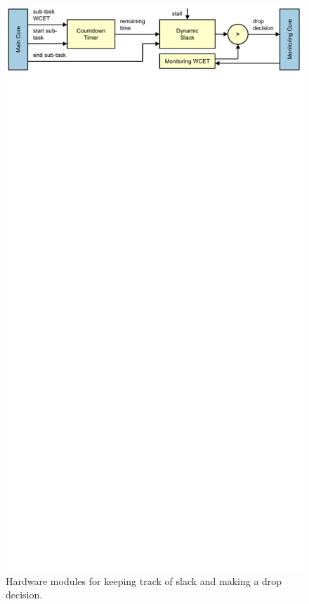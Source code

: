 \begin{figure}
  \begin{center}
    \includegraphics{monitoring_hard_drop/figs/slack_tracking.pdf}
    \caption{Hardware modules for keeping track of slack and making a drop decision.}
    \label{fig:monitoring_hard_drop.hwdrop.slack_tracking} 
  \end{center}
\end{figure}

